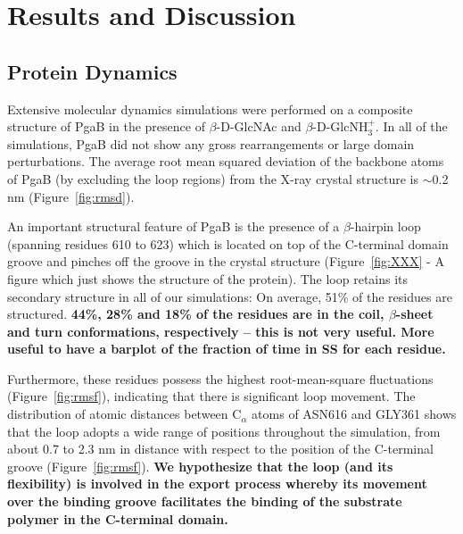 \section{Results and Discussion}

\subsection{Protein Dynamics}

Extensive molecular dynamics simulations were performed on a composite structure of PgaB in the presence of $\beta$-D-GlcNAc and $\beta$-D-GlcNH$_{3}^{+}$. In all of the simulations, PgaB did not show any gross rearrangements or large domain perturbations. The average root mean squared deviation of the backbone atoms of PgaB (by excluding the loop regions) from the X-ray crystal structure is $\sim$0.2 nm (Figure~\ref{fig:rmsd}).

An important structural feature of PgaB is the presence of a $\beta$-hairpin loop (spanning residues 610 to 623) which is located on top of the C-terminal domain groove and pinches off the groove in the crystal structure (Figure~\ref{fig:XXX} - A figure which just shows the structure of the protein). The loop retains its secondary structure in all of our simulations: On average, 51\% of the residues are structured. \textbf{44\%, 28\% and 18\% of the residues are in the coil, $\beta$-sheet and turn conformations, respectively -- this is not very useful. More useful to have a barplot of the fraction of time in SS for each residue.} %

Furthermore, these residues possess the highest root-mean-square fluctuations (Figure~\ref{fig:rmsf}), indicating that there is significant loop movement. The distribution of atomic distances between C$_\alpha$ atoms of ASN616 and GLY361 shows that the loop adopts a wide range of positions throughout the simulation, from about 0.7 to 2.3 nm in distance with respect to the position of the C-terminal groove (Figure~\ref{fig:rmsf}). \textbf{We hypothesize that the loop (and its flexibility) is involved in the export process whereby its movement over the binding groove facilitates the binding of the substrate polymer in the C-terminal domain.}


